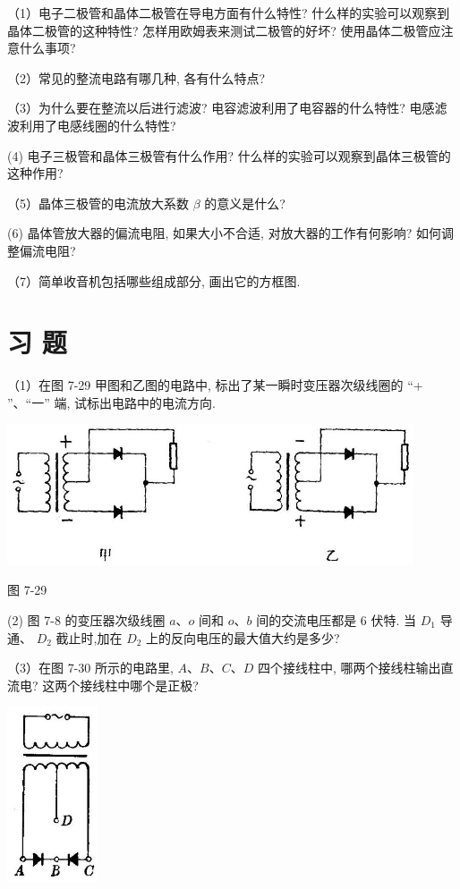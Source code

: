 \documentclass[10pt]{article}
\begin{document}
（1）电子二极管和晶体二极管在导电方面有什么特性? 什么样的实验可以观察到晶体二极管的这种特性? 怎样用欧姆表来测试二极管的好坏? 使用晶体二极管应注意什么事项?

（2）常见的整流电路有哪几种, 各有什么特点?

（3）为什么要在整流以后进行滤波? 电容滤波利用了电容器的什么特性? 电感滤波利用了电感线圈的什么特性?

(4) 电子三极管和晶体三极管有什么作用? 什么样的实验可以观察到晶体三极管的这种作用?

（5）晶体三极管的电流放大系数 \(\beta\) 的意义是什么?

(6) 晶体管放大器的偏流电阻, 如果大小不合适, 对放大器的工作有何影响? 如何调整偏流电阻?

（7）简单收音机包括哪些组成部分, 画出它的方框图.

\section*{习 题}

（1）在图 7-29 甲图和乙图的电路中, 标出了某一瞬时变压器次级线圈的 “+ ”、“一” 端, 试标出电路中的电流方向.

\begin{center}
\includegraphics[max width=0.9\textwidth]{images/01913056-1f15-74d8-9184-9aab52c9d66b_241_161855.jpg}
\end{center}

图 7-29

(2) 图 7-8 的变压器次级线圈 \(a\text{、}o\) 间和 \(o\text{、}b\) 间的交流电压都是 6 伏特. 当 \({D}_{1}\) 导通、 \({D}_{2}\) 截止时,加在 \({D}_{2}\) 上的反向电压的最大值大约是多少?

（3）在图 7-30 所示的电路里, \(A\text{、}B\text{、}C\text{、}D\) 四个接线柱中, 哪两个接线柱输出直流电? 这两个接线柱中哪个是正极?

\begin{center}
\includegraphics[max width=0.2\textwidth]{images/01913056-1f15-74d8-9184-9aab52c9d66b_242_445642.jpg}
\end{center}
\end{document}
